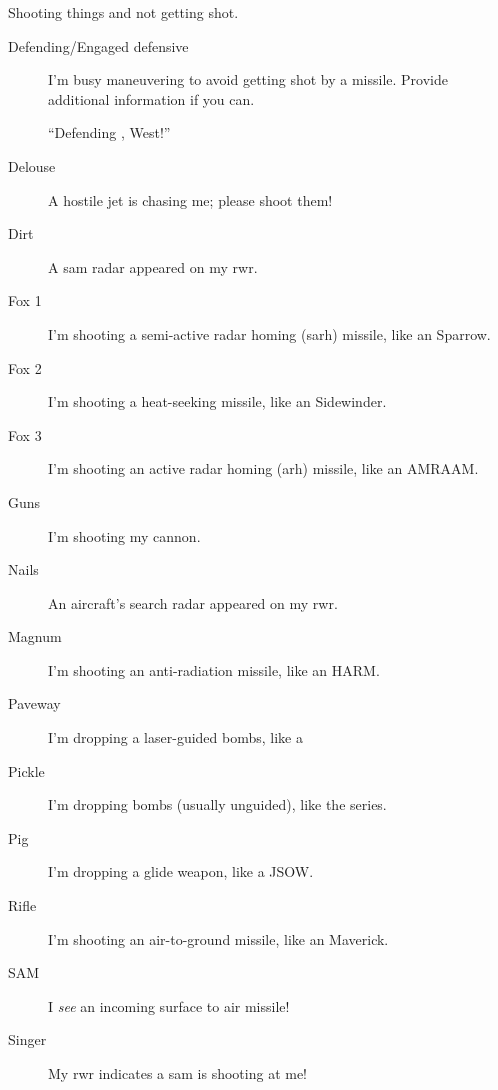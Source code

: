 Shooting things and not getting shot.
\begin{description}

\item[Defending/Engaged defensive] I'm busy maneuvering to avoid getting shot by
    a missile. Provide additional information if you can.

    ``Defending , West!''

\item[Delouse] A hostile jet is chasing me; please shoot them!

\item[Dirt] A \ac{sam} radar appeared on my \ac{rwr}.

\item[Fox 1] I'm shooting a semi-active radar homing \ac{(sarh)}
    missile, like an  Sparrow.
\item[Fox 2] I'm shooting a heat-seeking missile, like an
     Sidewinder.
\item[Fox 3] I'm shooting an active radar homing \ac{(arh)} missile,
    like an  AMRAAM.

\item[Guns] I'm shooting my cannon.

\item[Nails] An aircraft's search radar appeared on my \ac{rwr}.

\item[Magnum] I'm shooting an anti-radiation missile,
    like an  HARM.

\item[Paveway] I'm dropping a laser-guided bombs,
    like a 

\item[Pickle] I'm dropping bombs (usually unguided),
    like the  series.

\item[Pig] I'm dropping a glide weapon, like a  JSOW.

\item[Rifle] I'm shooting an air-to-ground missile,
    like an  Maverick.

\item[SAM] I \emph{see} an incoming surface to air missile!

\item[Singer] My \ac{rwr} indicates a \ac{sam} is shooting at me!


\end{description}
